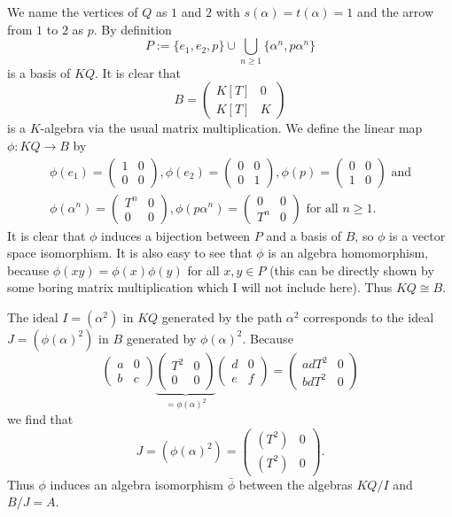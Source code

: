 \documentclass[a4paper,10pt]{article}
\theoremstyle{definition}
\newcommand{\vect}[1]{\begin{pmatrix}#1\end{pmatrix}}
\begin{document}
\section{}
We name the vertices of $Q$ as $1$ and $2$ with $s(\alpha) = t(\alpha) = 1$ and the arrow from $1$ to $2$ as $p$. By definition
\[
 P := \{e_1, e_2, p\} \cup \bigcup_{n \geq 1} \{\alpha^n, p\alpha^n \}
\]
is a basis of $KQ$. It is clear that
\[
 B =
 \begin{pmatrix}
  K[T] & 0 \\
  K[T] & K
 \end{pmatrix}
\]
is a $K$-algebra via the usual matrix multiplication. We define the linear map $\phi : KQ \rightarrow B$ by
\begin{gather*}
 \phi(e_1) = \vect{1 & 0 \\ 0 & 0},
 \phi(e_2) = \vect{0 & 0 \\ 0 & 1},
 \phi(p) = \vect{0 & 0 \\ 1 & 0} \text{ and} \\
 \phi(\alpha^n) = \vect{T^n & 0 \\ 0 & 0},
 \phi(p\alpha^n) = \vect{0 & 0 \\ T^n & 0} \text{ for all } n \geq 1.
\end{gather*}
It is clear that $\phi$ induces a bijection between $P$ and a basis of $B$, so $\phi$ is a vector space isomorphism. It is also easy to see that $\phi$ is an algebra homomorphism, because $\phi(xy) = \phi(x)\phi(y)$ for all $x,y \in P$ (this can be directly shown by some boring matrix multiplication which I will not include here). Thus $KQ \cong B$.

The ideal $I = (\alpha^2)$ in $KQ$ generated by the path $\alpha^2$ corresponds to the ideal $J = (\phi(\alpha)^2)$ in $B$ generated by $\phi(\alpha)^2$. Because
\[
 \begin{pmatrix}
  a & 0 \\
  b & c
 \end{pmatrix}
 \underbrace{\begin{pmatrix}
  T^2 & 0 \\
  0 & 0
 \end{pmatrix}}_{= \phi(\alpha)^2}
 \begin{pmatrix}
  d & 0 \\
  e & f
 \end{pmatrix}
 =
 \begin{pmatrix}
  adT^2 & 0 \\
  bdT^2 & 0
 \end{pmatrix}
\]
we find that
\[
 J
 =
 (\phi(\alpha)^2)
 =
 \begin{pmatrix}
  (T^2) & 0 \\
  (T^2) & 0
 \end{pmatrix}.
\]
Thus $\phi$ induces an algebra isomorphism $\bar{\phi}$ between the algebras $KQ/I$ and $B/J = A$.
\end{document}
